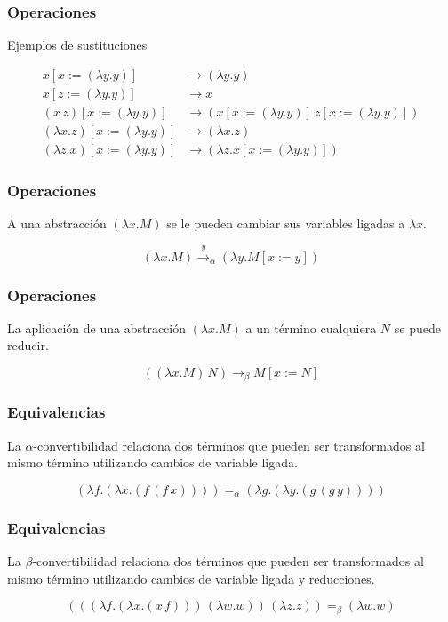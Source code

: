 \documentclass[pdf]{beamer}
\begin{document}
\begin{frame}
  \frametitle{Operaciones}

  Ejemplos de sustituciones

  \begin{align*}
    x[x:=(λy.y)] &\rightarrow (λy.y) \\
    x[z:=(λy.y)] &\rightarrow x \\
    (x\, z)[x:=(λy.y)] &\rightarrow (x[x:=(λy.y)]\ z[x:=(λy.y)]) \\
    (λx.z)[x:=(λy.y)] &\rightarrow (λx.z) \\
    (λz.x)[x:=(λy.y)] &\rightarrow (λz.x[x:=(λy.y)])
  \end{align*}
\end{frame}

\begin{frame}
  \frametitle{Operaciones}
  A una abstracción \( (λx.M) \) se le pueden \alert{cambiar sus variables ligadas} a \( λx \).

  \vfill
  
  \[ (λx.M) \overset{y}{\rightarrow}_{α} (λy.M[x:=y]) \]
 
\end{frame}

\begin{frame}
  \frametitle{Operaciones}
  La aplicación de una abstracción \( (λx.M) \) a un término cualquiera \( N \) se puede \alert{reducir}.

  \vfill

  \[ ((λx.M)\, N) \rightarrow_{β} M[x:=N] \]
  
\end{frame}

\begin{frame}
  \frametitle{Equivalencias}

  La \( α \)-convertibilidad relaciona dos términos que pueden ser transformados al mismo término utilizando cambios de variable ligada.

  \[ (λf.(λx.(f\, (f\, x)))) =_{α} (λg.(λy.(g\, (g\, y)))) \]
  
\end{frame}

\begin{frame}
  \frametitle{Equivalencias}

  La \( β \)-convertibilidad relaciona dos términos que pueden ser transformados al mismo término utilizando cambios de variable ligada y reducciones.

  \[ (((λf.(λx.(x\, f)))\, (λw.w))\, (λz.z)) =_{β} (λw.w) \]
  
\end{frame}
\end{document}
